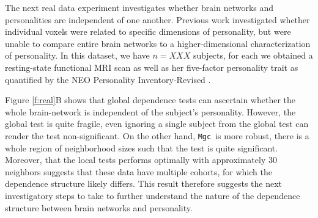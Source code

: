 \documentclass[11pt]{article}
\newcommand{\note}[2][]{\added[#1,remark={#2}]{}}
\providecommand{\sct}[1]{{\sc \texttt{#1}}}
\newcommand{\Migraine}{\sct{Migraine}}
\newcommand{\mtg}{\sct{m2g}}
\newcommand{\Mgc}{\sct{Mgc}}
\newcommand{\cs}[1]{{\note{cs: #1}}}
\begin{document}
The next real data experiment investigates whether brain networks and personalities are independent of one another. Previous work \cite{AdelsteinEtAl2011} investigated whether individual voxels were related to specific dimensions of personality, but were unable to compare entire brain networks to a higher-dimensional characterization of personality. 
In this dataset, we have $n=XXX$ subjects, for each we obtained a resting-state functional MRI scan as well as her five-factor personality trait as quantified by  the NEO Personality Inventory-Revised  \cite{Costa1992}. \cs{how many subjects? which atlas did we use? how did we represent the data? what metric did we use for each view? etc.}  

 Figure \ref{f:real}B shows that  global dependence tests can ascertain whether the whole brain-network is independent of the subject's personality.  However, the global test is quite fragile, even ignoring a single subject from the global test can render the test non-significant.  On the other hand, \Mgc~is more robust, there is a whole region of neighborhood sizes such that the test is quite significant.  Moreover, that the local tests performs optimally with approximately 30 neighbors suggests that these data have multiple cohorts, for which the dependence structure likely differs.  This result therefore suggests  the next investigatory steps to take to further understand the nature of the dependence structure between brain networks and personality.




\end{document}
